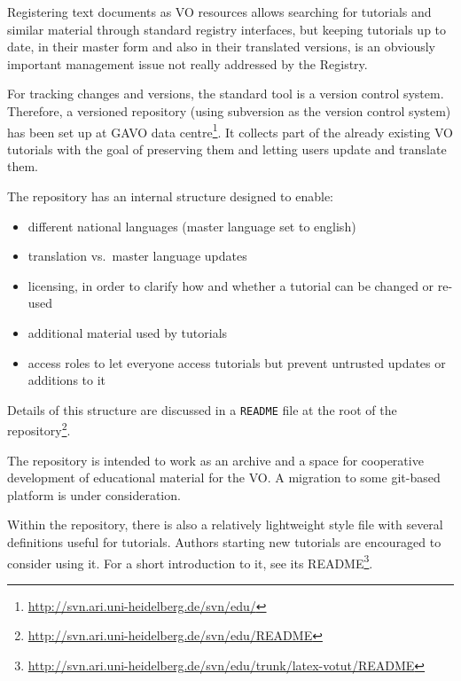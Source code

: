\documentclass{ivoa}
\begin{document}
\label{sect:svn-repo}

Registering text documents as VO resources allows searching for tutorials
and similar
material through standard registry interfaces, but keeping
tutorials up to date, in their master form and also in their translated
versions, is an obviously important management issue not really
addressed by the Registry.

For tracking changes and versions, the standard tool is a version
control system.  Therefore,
a versioned repository (using subversion as the version control system)
has been set up at GAVO data
centre\footnote{\url{http://svn.ari.uni-heidelberg.de/svn/edu/}}.
It collects part of the
already existing VO tutorials with the goal of preserving them and
letting users
update and translate them.

The repository has an internal structure designed to enable:

\begin{itemize}

\item different national languages (master language set to english){}

\item translation vs.~master language updates{}

\item licensing, in order to clarify how and whether a tutorial can be changed or re-used{}

\item additional material used by tutorials

\item access roles to let everyone access tutorials but prevent untrusted updates or additions to it

\end{itemize}

Details of this structure are discussed in a \texttt{README} file at the
root of the
repository\footnote{\url{http://svn.ari.uni-heidelberg.de/svn/edu/README}}.

The repository is intended to work as an archive and a space for cooperative
development of educational material for the VO.  A migration to some
git-based platform is under consideration.

Within the repository, there is also a relatively lightweight style file
with several definitions useful for tutorials.  Authors starting new
tutorials are encouraged to consider using it.  For a short introduction
to it, see its README\footnote{\url{http://svn.ari.uni-heidelberg.de/svn/edu/trunk/latex-votut/README}}.
\end{document}
